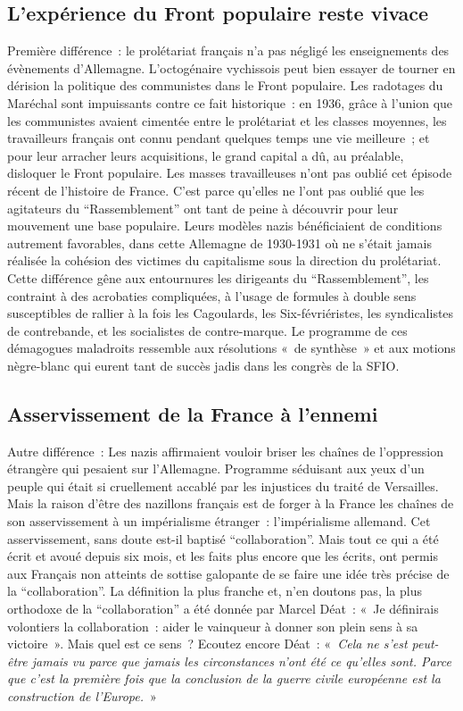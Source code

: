 \documentclass[french,twoside]{book} %
\begin{document}
\subsection[L’expérience du Front populaire reste vivace]{L’expérience du Front populaire reste vivace}
\noindent Première différence : le prolétariat français n’a pas négligé les enseignements des évènements d’Allemagne. L’octogénaire vychissois peut bien essayer de tourner en dérision la politique des communistes dans le Front populaire. Les radotages du Maréchal sont impuissants contre ce fait historique : en 1936, grâce à l’union que les communistes avaient cimentée entre le prolétariat et les classes moyennes, les travailleurs français ont connu pendant quelques temps une vie meilleure ; et pour leur arracher leurs acquisitions, le grand capital a dû, au préalable, disloquer le Front populaire. Les masses travailleuses n’ont pas oublié cet épisode récent de l’histoire de France. C’est parce qu’elles ne l’ont pas oublié que les agitateurs du “Rassemblement” ont tant de peine à découvrir pour leur mouvement une base populaire. Leurs modèles nazis bénéficiaient de conditions autrement favorables, dans cette Allemagne de 1930-1931 où ne s’était jamais réalisée la cohésion des victimes du capitalisme sous la direction du prolétariat. Cette différence gêne aux entournures les dirigeants du “Rassemblement”, les contraint à des acrobaties compliquées, à l’usage de formules à double sens susceptibles de rallier à la fois les Cagoulards, les Six-févriéristes, les syndicalistes de contrebande, et les socialistes de contre-marque. Le programme de ces démagogues maladroits ressemble aux résolutions « de synthèse » et aux motions nègre-blanc qui eurent tant de succès jadis dans les congrès de la SFIO.
\subsection[Asservissement de la France à l’ennemi]{Asservissement de la France à l’ennemi}
\noindent Autre différence : Les nazis affirmaient vouloir briser les chaînes de l’oppression étrangère qui pesaient sur l’Allemagne. Programme séduisant aux yeux d’un peuple qui était si cruellement accablé par les injustices du traité de Versailles. Mais la raison d’être des nazillons français est de forger à la France les chaînes de son asservissement à un impérialisme étranger : l’impérialisme allemand. Cet asservissement, sans doute est-il baptisé “collaboration”. Mais tout ce qui a été écrit et avoué depuis six mois, et les faits plus encore que les écrits, ont permis aux Français non atteints de sottise galopante de se faire une idée très précise de la “collaboration”. La définition la plus franche et, n’en doutons pas, la plus orthodoxe de la “collaboration” a été donnée par Marcel Déat : « Je définirais volontiers la collaboration : aider le vainqueur à donner son plein sens à sa victoire ». Mais quel est ce sens ? Ecoutez encore Déat : « \emph{Cela ne s’est peut-être jamais vu parce que jamais les circonstances n’ont été ce qu’elles sont. Parce que c’est la première fois que la conclusion de la guerre civile européenne est la construction de l’Europe.} »
\end{document}
